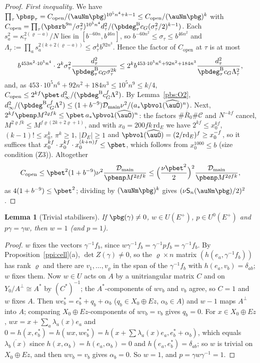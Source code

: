 \documentclass[10pt]{amsart}
\newtheorem{lemma}[theorem]{Lemma}
\theoremstyle{definition}
\theoremstyle{remark}
\providecommand{\aubar}[1]{\overline{#1}}
\providecommand{\pbDmain}{\mathcal D_{\mathrm{main}}}
\providecommand{\pbR}{\overline R_0}
\begin{document}
\begin{proof}
\emph{First inequality.} We have $\prod_\tau\pbsp_\tau=C_{\mathrm{open}}/(\auNm\pbg)^{10^5n^4+k-1}\le C_{
\mathrm{open}}/(\auNm\pbg)^k$ with $C_{\mathrm{open}}=\prod_\tau(\pbsrb^{9n}/\sigma_\tau^2)^{10^5n^4}\allowbreak d_\tau^2/
(\pbdeg^{\mathrm B}_\tau c_G(\sigma_\tau^2/2)^{k-1})$. Each $s_a^2=\kappa_\tau^{2(\varrho-a)}/N$ lies in $[b^{-60n},
b^{46n}]$, so $b^{-60n^2}\le\sigma_\tau\le b^{46n^2}$ and $\Lambda_\tau:=\prod_as_a^{2(k+2(\varrho-a))}\le\sigma_\tau^k
b^{92n^3}$. Hence the factor of $C_{\mathrm{open}}$ at $\tau$ is at most
\[
b^{453n^2\cdot10^5n^4}\cdot2^k\sigma_\tau^2\frac{d_\tau^2}{\pbdeg^{\mathrm B}_\tau c_G\sigma_\tau^{2k}}\le2^kb^{
453\cdot10^5n^6+92n^2+184n^3}\frac{d_\tau^2}{\pbdeg^{\mathrm B}_\tau c_G\Lambda_\tau^2},
\]
and, as $453\cdot10^5n^6+92n^2+184n^3\le10^5n^9\le k/4$, $C_{\mathrm{open}}\le2^{kf}\pbet\,d_\infty^2/(\pbdeg^{
\mathrm B}c_G^f\Lambda^2)$. By Lemma~\ref{pbs:O2}, $d_\infty^2/(\pbdeg^{\mathrm B}c_G^f\Lambda^2)\le(1+b^{-9})\pbDmain\nu^2/(a_*
\pbvol(\widehat\auO)^n)$. Next, $2^{kf}\pbenp M^{2\varrho fk}\le\pbet\,a_*\pbvol(\widehat\auO)^n$: the factors
$\#\pbR\#\mathcal C$ and $N^{-kf}$ cancel, $M^{2\varrho fk}\le M^{f\varrho(2k+2\varrho+1)}$, and with
$x_0=200fk\,\mathrm{rd}_E$ we have $2^{kf}\le x_0^{kf}$, $(k-1)!\le x_0^k$, $\pi^k\ge1$, $|D_E|\ge1$ and
$\pbvol(\widehat\auO)=(2/\mathrm{rd}_E)^f\ge x_0^{-f}$, so it suffices that $x_0^{kf}\cdot x_0^{kf}\cdot
x_0^{(k+n)f}\le\pbet$, which follows from $x_0^{1000}\le b$ (size condition (Z3)). Altogether
\[
C_{\mathrm{open}}\le\pbet^2(1+b^{-9})\nu^2\frac{\pbDmain}{\pbenp M^{2\varrho fk}}\le\Bigl(\frac{\nu\pbet^2}2
\Bigr)^2\frac{\pbDmain}{\pbenp M^{2\varrho fk}},
\]
as $4(1+b^{-9})\le\pbet^2$; dividing by $(\auNm\pbg)^k$ gives $(\nu\mathsf S_n(\auNm\pbg)/2)^2$.
\end{proof}

\begin{lemma}[Trivial stabilisers]\label{pbs:stab}
If $\pbg(\gamma)\ne0$, $w\in U(E^+)$, $p\in U^0(E^+)$ and $p\gamma=\gamma w$, then $w=1$ (and $p=1$).
\end{lemma}
\begin{proof}
$w$ fixes the vectors $\gamma^{-1}f_b$, since $w\gamma^{-1}f_b=\gamma^{-1}pf_b=\gamma^{-1}f_b$. By
Proposition~\ref{ppi:cell}(a), $\det Z(\gamma)\ne0$, so the $\varrho\times n$ matrix $(h(e_a,\gamma^{-1}f_b))$
has rank $\varrho$ and there are $v_1,\dots,v_\varrho$ in the span of the $\gamma^{-1}f_b$ with $h(e_a,v_b)=
\delta_{ab}$; $w$ fixes them. Now $w\in U$ acts on $A$ by a unitriangular matrix $C$ and on $Y_0/A^\perp
\cong A^*$ by $(C^*)^{-1}$; the $A^*$-components of $wv_b$ and $v_b$ agree, so $C=1$ and $w$ fixes $A$.
Then $we^*_b=e^*_b+q_b+\alpha_b$ ($q_b\in X_0\oplus Ez$, $\alpha_b\in A$) and $w-1$ maps $A^\perp$ into $A$;
comparing $X_0\oplus Ez$-components of $wv_b=v_b$ gives $q_b=0$. For $x\in X_0\oplus Ez$, $wx=x+\sum_a
\lambda_a(x)e_a$ and $0=h(x,e^*_b)=h(wx,we^*_b)=h(x+\sum\lambda_a(x)e_a,e^*_b+\alpha_b)$, which equals
$\aubar{\lambda_b(x)}$ since $h(x,\alpha_b)=h(e_a,\alpha_b)=0$ and $h(e_a,e^*_b)=\delta_{ab}$; so $w$ is trivial on $X_0\oplus Ez$, and then
$wv_b=v_b$ gives $\alpha_b=0$. So $w=1$, and $p=\gamma w\gamma^{-1}=1$.
\end{proof}
\end{document}
